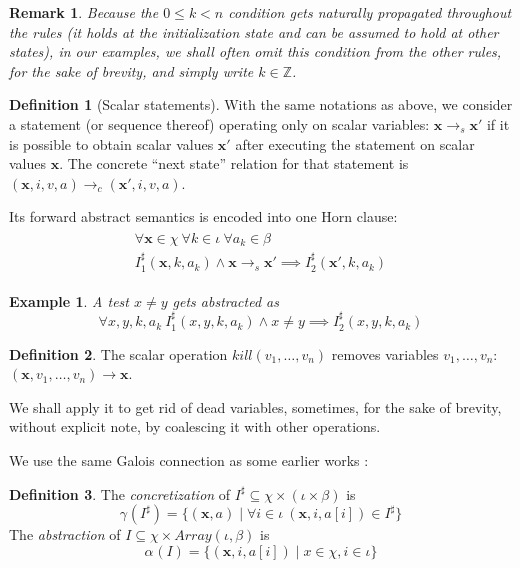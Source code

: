 \documentclass[a4paper]{article}
\newcommand{\ve}[1]{\mathbf{#1}}
\newcommand{\vx}{\ve{x}}
\newcommand{\ZZ}{\mathbb{Z}}
\newcommand{\arraytype}[2]{\mathit{Array}\left(#1,#2\right)}
\newcommand{\abstr}[1]{#1^\sharp}
\newcommand{\abstraction}[2][]{\alpha_{#1}\left(#2\right)}
\newcommand{\concretization}[2][]{\gamma_{#1}\left(#2\right)}
\theoremstyle{definition}
\newtheorem{definition}{Definition}
\theoremstyle{plain}
\newtheorem{example}{Example}
\newtheorem{remark}{Remark}
\begin{document}
\begin{remark}
Because the $0 \leq k <n$ condition gets naturally propagated throughout the rules (it holds at the initialization state and can be assumed to hold at other states), in our examples, we shall often omit this condition from the other rules, for the sake of brevity, and simply write $k \in \ZZ$.
\end{remark}

\begin{definition}[Scalar statements]\label{def:scalar1}
With the same notations as above, we consider a statement (or sequence thereof) operating only on scalar variables: $\vx \rightarrow_s \vx'$ if it is possible to obtain scalar values $\vx'$ after executing the statement on scalar values $\vx$.
The concrete ``next state'' relation for that statement is
$(\vx,i,v,a) \rightarrow_c (\vx',i,v,a)$.

Its forward abstract semantics is encoded into one Horn clause:
\begin{align}
\begin{aligned}
\forall \vx \in \chi~ \forall k \in \iota~ \forall a_k \in \beta\\
  \abstr{I}_1(\vx,k,a_k) \land \vx \rightarrow_s \vx'
  \implies \abstr{I}_2(\vx',k,a_k)
\end{aligned}
\end{align}
\end{definition}

\begin{example}
A test $x \neq y$ gets abstracted as
\begin{equation}
\forall x,y,k,a_k~ \abstr{I}_1(x,y,k,a_k) \land x \neq y \implies
                    \abstr{I}_2(x,y,k,a_k)
\end{equation}
\end{example}

\begin{definition}\label{def:kill}
The scalar operation $\mathit{kill}(v_1,\dots,v_n)$ removes variables $v_1,\dots,v_n$: $(\vx,v_1,\dots,v_n) \rightarrow \vx$.
\end{definition}

We shall apply it to get rid of dead variables, sometimes, for the sake of brevity, without explicit note, by coalescing it with other operations.


We use the same Galois connection \cite{DBLP:journals/logcom/CousotC92} as some earlier works \cite{Monniaux_Alberti_SAS2015} \cite[Sec.~2.1]{DBLP:conf/iccl/CousotC94}:
\begin{definition}\label{def:Galois1}
The \emph{concretization} of $\abstr{I} \subseteq \chi \times (\iota \times \beta)$ is
\begin{equation}
\concretization{\abstr{I}} = \{ (\vx,a) \mid
  \forall i\in\iota~ (\vx,i,a[i]) \in \abstr{I} \}
\end{equation}
The \emph{abstraction} of $I \subseteq \chi \times \arraytype{\iota}{\beta}$ is
\begin{equation}
\abstraction{I} = \{ (\vx,i,a[i]) \mid x \in \chi, i \in \iota \}
\end{equation}
\end{definition}
\end{document}
